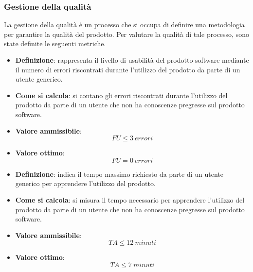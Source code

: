\subsubsection{Gestione della qualità}
La gestione della qualità è un processo che si occupa di definire una metodologia per garantire la qualità del prodotto. Per valutare la qualità di tale processo, sono state definite le seguenti metriche.

\hypertarget{21M}{}
\begin{itemize}
	\item \textbf{Definizione}: rappresenta il livello di usabilità del prodotto software mediante il numero di errori riscontrati durante l'utilizzo del prodotto da parte di un utente generico.
	\item \textbf{Come si calcola}: si contano gli errori riscontrati durante l'utilizzo del prodotto da parte di un utente che non ha conoscenze pregresse sul prodotto software.
	\item \textbf{Valore ammissibile}: \begin{equation*}FU \leq 3\ errori\end{equation*}
	\item \textbf{Valore ottimo}: \begin{equation*}FU = 0\ errori\end{equation*}
\end{itemize}

\hypertarget{22M}{}
\begin{itemize}
	\item \textbf{Definizione}: indica il tempo massimo richiesto da parte di un utente generico per apprendere l'utilizzo del prodotto.
	\item \textbf{Come si calcola}: si misura il tempo necessario per apprendere l'utilizzo del prodotto da parte di un utente che non ha conoscenze pregresse sul prodotto software.
	\item \textbf{Valore ammissibile}: \begin{equation*}TA \leq 12\ minuti\end{equation*}
	\item \textbf{Valore ottimo}: \begin{equation*}TA \leq 7\ minuti\end{equation*}
\end{itemize}

